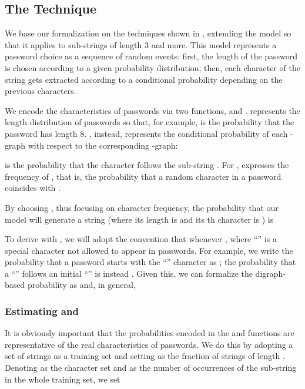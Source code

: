 \documentclass[a4paper,twocolumn]{article}
\begin{document}
\subsection{The Technique}

We base our formalization on the techniques shown in \cite{Narayanan2005Fast},
extending the model so that it applies to sub-strings of length 3
and more. This model represents a password choice as a sequence of
random events: first, the length of the password is chosen according
to a given probability distribution; then, each character of the string
gets extracted according to a conditional probability depending on
the previous  characters.

We encode the characteristics of passwords via two functions, 
and .  represents the length distribution of passwords
so that, for example,  is the probability
that the password has length 8. , instead, represents the conditional
probability of each -graph with respect to the corresponding -graph:

is the probability that the character  follows the sub-string
. For ,  expresses
the frequency of , that is, the probability that a random character
in a password coincides with .

By choosing , thus focusing on character frequency, the probability
 that our model will generate a string
 (where its length is  and its th
character is ) is




To derive  with , we will adopt the convention that
 whenever , where {}``''
is a special character not allowed to appear in passwords. For example,
we write the probability that a password starts with the {}``''
character as ;
the probability that a {}``'' follows an initial {}``''
is instead .
Given this, we can formalize the digraph-based probability 
as 
and, in general, 





\subsubsection{Estimating  and }

It is obviously important that the probabilities encoded in the 
and  functions are representative of the real characteristics
of passwords. We do this by adopting a set of strings as a training
set and setting  as the fraction of strings
of length . Denoting  as the character set and 
as the number of occurrences of the sub-string 
in the whole training set, we set
\end{document}
